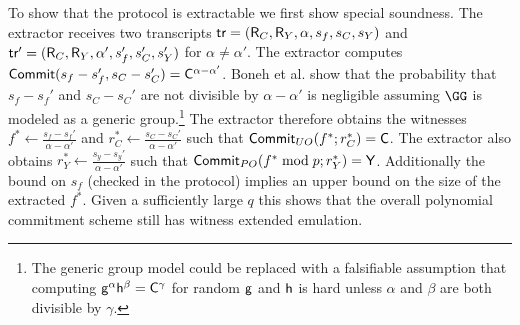  To show that the protocol is extractable we first show special soundness. The extractor receives two transcripts $\textsf{{tr}}=(\mathsf{R}_C,\mathsf{R}_Y,\alpha,s_f,s_C,s_Y)$ and $\textsf{{tr}}'=(\mathsf{R}_C,\mathsf{R}_Y,\alpha',s_f',s_C',s_Y')$ for $\alpha \neq \alpha'$. The extractor computes $\textsf{{Commit}}(s_f-s_f',s_C-s_C')=\mathsf{C}^{\alpha-\alpha'}$. Boneh et al. \cite{C:BonBunFis19} show that the probability that $s_f-s_f'$ and $s_C-s_C'$  are not divisible by $\alpha-\alpha'$ is negligible assuming $\GG$ is modeled as a generic group.\footnote{The generic group model could be replaced with a falsifiable assumption that computing $\mathsf{g}^\alpha\mathsf{h}^\beta=\mathsf{C}^\gamma$ for random $\mathsf{g}$ and $\mathsf{h}$ is hard unless $\alpha$ and $\beta$ are both divisible by $\gamma$.} The extractor therefore obtains the witnesses $f^* \leftarrow \frac{ s_f-s_f'}{\alpha-\alpha'}$ and $r_C^* \leftarrow \frac{ s_C-s_C'}{\alpha-\alpha'}$ such that $\textsf{{Commit}}_{UO}(f^*; r_C^*)=\mathsf{C}$. The extractor also obtains $r_Y^* \leftarrow \frac{s_y-s_y'}{\alpha-\alpha'}$ such that $\textsf{{Commit}}_{PO}( f^* \bmod p; r_Y^*)=\mathsf{Y}$. %
 Additionally the bound on $s_f$ (checked in the protocol) implies an upper bound on the size of the extracted $f^*$. 
 Given a sufficiently large $q$ this shows that the overall polynomial commitment scheme still has witness extended emulation.